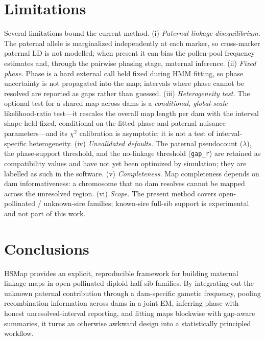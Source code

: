 \documentclass[11pt]{article}
\begin{document}
\section{Limitations}\label{sec:limitations}
Several limitations bound the current method. (i) \emph{Paternal linkage disequilibrium.}
The paternal allele is marginalized independently at each marker, so cross-marker paternal
LD is not modelled; when present it can bias the pollen-pool frequency estimates and,
through the pairwise phasing stage, maternal inference. (ii) \emph{Fixed phase.} Phase is
a hard external call held fixed during HMM fitting, so phase uncertainty is not propagated
into the map; intervals where phase cannot be resolved are reported as gaps rather than
guessed. (iii) \emph{Heterogeneity test.} The optional test for a shared map across dams
is a \emph{conditional, global-scale} likelihood-ratio test---it rescales the overall map
length per dam with the interval shape held fixed, conditional on the fitted phase and
paternal nuisance parameters---and its $\chi^2$ calibration is asymptotic; it is not a test
of interval-specific heterogeneity. (iv) \emph{Unvalidated defaults.} The paternal
pseudocount ($\lambda$), the phase-support threshold, and the no-linkage threshold
(\texttt{gap\_r}) are retained as compatibility values and have not yet been optimized by
simulation; they are labelled as such in the software. (v) \emph{Completeness.} Map
completeness depends on dam informativeness: a chromosome that no dam resolves cannot be
mapped across the unresolved region. (vi) \emph{Scope.} The present method covers
open-pollinated / unknown-sire families; known-sire full-sib support is experimental and
not part of this work.

\section{Conclusions}
\textsf{HSMap} provides an explicit, reproducible framework for building maternal linkage
maps in open-pollinated diploid half-sib families. By integrating out the unknown paternal
contribution through a dam-specific gametic frequency, pooling recombination information
across dams in a joint EM, inferring phase with honest unresolved-interval reporting, and
fitting maps blockwise with gap-aware summaries, it turns an otherwise awkward design into
a statistically principled workflow.
\end{document}
